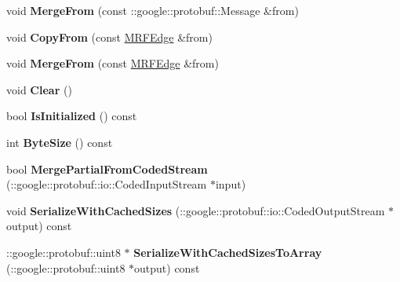 \begin{DoxyCompactItemize}
\item 
\hypertarget{classgraph_1_1MRFEdge_a83fe505e1c12d298d726853b09e566ad}{
void {\bfseries MergeFrom} (const ::google::protobuf::Message \&from)}
\label{classgraph_1_1MRFEdge_a83fe505e1c12d298d726853b09e566ad}

\item 
\hypertarget{classgraph_1_1MRFEdge_a432538f9cc47eaf753e771a1b6cb9a81}{
void {\bfseries CopyFrom} (const \hyperlink{classgraph_1_1MRFEdge}{MRFEdge} \&from)}
\label{classgraph_1_1MRFEdge_a432538f9cc47eaf753e771a1b6cb9a81}

\item 
\hypertarget{classgraph_1_1MRFEdge_a861a18199b5be517a96cd5b355a3c668}{
void {\bfseries MergeFrom} (const \hyperlink{classgraph_1_1MRFEdge}{MRFEdge} \&from)}
\label{classgraph_1_1MRFEdge_a861a18199b5be517a96cd5b355a3c668}

\item 
\hypertarget{classgraph_1_1MRFEdge_ab9d3b2159e6b42fe5fe5f3c4840a151b}{
void {\bfseries Clear} ()}
\label{classgraph_1_1MRFEdge_ab9d3b2159e6b42fe5fe5f3c4840a151b}

\item 
\hypertarget{classgraph_1_1MRFEdge_a11b542bb15495a1fbee395763ee4e22d}{
bool {\bfseries IsInitialized} () const }
\label{classgraph_1_1MRFEdge_a11b542bb15495a1fbee395763ee4e22d}

\item 
\hypertarget{classgraph_1_1MRFEdge_ae857214ec9afbe8246f3027afb231770}{
int {\bfseries ByteSize} () const }
\label{classgraph_1_1MRFEdge_ae857214ec9afbe8246f3027afb231770}

\item 
\hypertarget{classgraph_1_1MRFEdge_abb481822efd72255228c00617b26a9b8}{
bool {\bfseries MergePartialFromCodedStream} (::google::protobuf::io::CodedInputStream $\ast$input)}
\label{classgraph_1_1MRFEdge_abb481822efd72255228c00617b26a9b8}

\item 
\hypertarget{classgraph_1_1MRFEdge_a8b119214980a5375a373bf7acf38f841}{
void {\bfseries SerializeWithCachedSizes} (::google::protobuf::io::CodedOutputStream $\ast$output) const }
\label{classgraph_1_1MRFEdge_a8b119214980a5375a373bf7acf38f841}

\item 
\hypertarget{classgraph_1_1MRFEdge_a5b9122af9f678bf164beab47ca09c7e5}{
::google::protobuf::uint8 $\ast$ {\bfseries SerializeWithCachedSizesToArray} (::google::protobuf::uint8 $\ast$output) const }
\label{classgraph_1_1MRFEdge_a5b9122af9f678bf164beab47ca09c7e5}


\end{DoxyCompactItemize}
